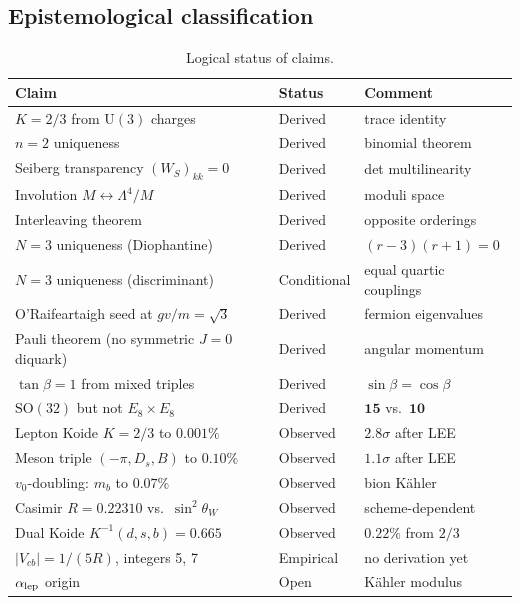 \documentclass[12pt,a4paper]{article}
\newcommand{\UU}{\mathrm{U}}
\newcommand{\SO}{\mathrm{SO}}
\begin{document}
\subsection{Epistemological classification}

\begin{table}[ht]
\centering\small
\begin{tabular}{lll}
\hline
Claim & Status & Comment \\
\hline
$K = 2/3$ from $\UU(3)$ charges & Derived & trace identity \\
$n = 2$ uniqueness & Derived & binomial theorem \\
Seiberg transparency $(W_S)_{kk} = 0$ & Derived & det multilinearity \\
Involution $M \leftrightarrow \Lambda^4/M$ & Derived & moduli space \\
Interleaving theorem & Derived & opposite orderings \\
$N = 3$ uniqueness (Diophantine) & Derived & $(r-3)(r+1) = 0$ \\
$N = 3$ uniqueness (discriminant) & Conditional & equal quartic couplings \\
O'Raifeartaigh seed at $gv/m = \sqrt{3}$ & Derived & fermion eigenvalues \\
Pauli theorem (no symmetric $J{=}0$ diquark) & Derived & angular momentum \\
$\tan\beta = 1$ from mixed triples & Derived & $\sin\beta = \cos\beta$ \\
$\SO(32)$ but not $E_8 \times E_8$ & Derived & $\mathbf{15}$ vs.\ $\mathbf{10}$ \\
\hline
Lepton Koide $K = 2/3$ to $0.001\%$ & Observed & $2.8\sigma$ after LEE \\
Meson triple $(-\pi, D_s, B)$ to $0.10\%$ & Observed & $1.1\sigma$ after LEE \\
$v_0$-doubling: $m_b$ to $0.07\%$ & Observed & bion K\"ahler \\
Casimir $R = 0.22310$ vs.\ $\sin^2\theta_W$ & Observed & scheme-dependent \\
Dual Koide $K^{-1}(d,s,b) = 0.665$ & Observed & $0.22\%$ from $2/3$ \\
$|V_{cb}| = 1/(5R)$, integers 5, 7 & Empirical & no derivation yet \\
$\alpha_{\rm lep}$ origin & Open & K\"ahler modulus \\
\hline
\end{tabular}
\caption{Logical status of claims.}
\label{tab:status}
\end{table}
\end{document}
